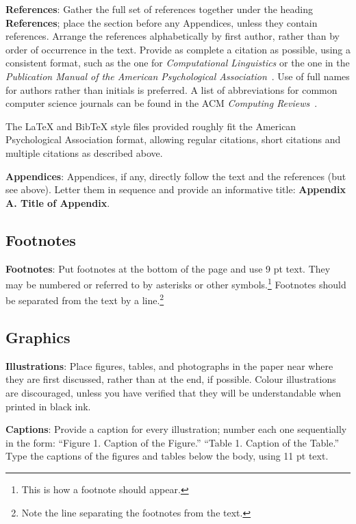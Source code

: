 \documentclass[11pt]{article}
\begin{document}
\textbf{References}: Gather the full set of references together under
the heading {\bf References}; place the section before any Appendices,
unless they contain references. Arrange the references alphabetically
by first author, rather than by order of occurrence in the text.
Provide as complete a citation as possible, using a consistent format,
such as the one for {\em Computational Linguistics\/} or the one in the 
{\em Publication Manual of the American 
Psychological Association\/}~\cite{APA:83}.  Use of full names for
authors rather than initials is preferred.  A list of abbreviations
for common computer science journals can be found in the ACM 
{\em Computing Reviews\/}~\cite{ACM:83}.

The \LaTeX{} and Bib\TeX{} style files provided roughly fit the
American Psychological Association format, allowing regular citations, 
short citations and multiple citations as described above.

{\bf Appendices}: Appendices, if any, directly follow the text and the
references (but see above).  Letter them in sequence and provide an
informative title: {\bf Appendix A. Title of Appendix}.

\subsection{Footnotes}

{\bf Footnotes}: Put footnotes at the bottom of the page and use 9 pt
text. They may be numbered or referred to by asterisks or other
symbols.\footnote{This is how a footnote should appear.} Footnotes
should be separated from the text by a line.\footnote{Note the line
separating the footnotes from the text.}

\subsection{Graphics}

{\bf Illustrations}: Place figures, tables, and photographs in the
paper near where they are first discussed, rather than at the end, if
possible. 
Colour
illustrations are discouraged, unless you have verified that  
they will be understandable when printed in black ink.

{\bf Captions}: Provide a caption for every illustration; number each one
sequentially in the form:  ``Figure 1. Caption of the Figure.'' ``Table 1.
Caption of the Table.''  Type the captions of the figures and 
tables below the body, using 11 pt text.
\end{document}
